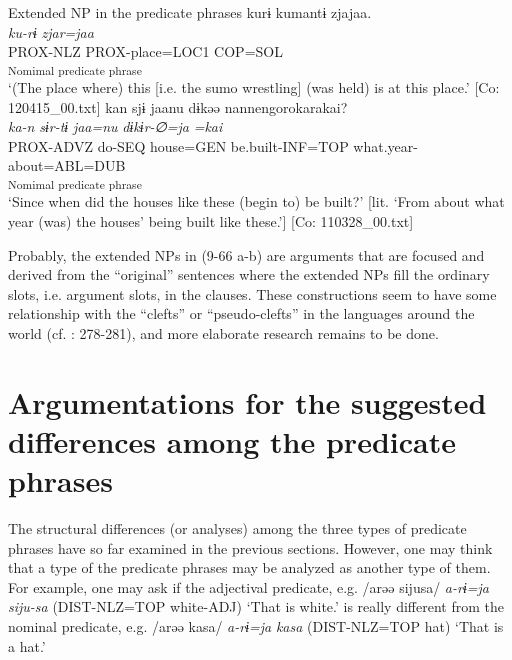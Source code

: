 \ea   Extended NP in the predicate phrases \label{ex:9.66}
\ea %
 \gllll  kurɨ  kumantɨ  zjajaa.\\
      \textit{ku-rɨ}  \textit{}  \textit{zjar=jaa}\\
      PROX-NLZ  PROX-place=LOC1  COP=SOL\\
        [Extended NP  Copula verb]\textsubscript{Nomimal predicate phrase}\\
      \glt       ‘(The place where) this [i.e. the sumo wrestling] (was held) is at this place.’ [Co: 120415\_00.txt]
\ex %
  \glll kan  sjɨ  jaanu  dɨkəə    {\textbar}nannengoro{\textbar}karakai?\\
      \textit{ka-n}  \textit{sɨr-tɨ}  \textit{jaa=nu}  \textit{dɨkɨr-∅=ja} \textit{=kai}\\                                                                           
      PROX-ADVZ  do-SEQ  house=GEN  be.built-INF=TOP                       what.year-about=ABL=DUB\\                                                                           
                                                                           [Extended NP]\textsubscript{Nomimal predicate phrase}\\
      \glt ‘Since when did the houses like these (begin to) be built?’ [lit. ‘From about what year (was) the houses’ being built like these.’]   [Co: 110328\_00.txt]
    \z
\z

Probably, the extended NPs in (9-66 a-b) are arguments that are focused and derived from the “original” sentences where the extended NPs fill the ordinary slots, i.e. argument slots, in the clauses. These constructions seem to have some relationship with the “clefts” or “pseudo-clefts” in the languages around the world (cf. \citealt{Payne1997}: 278-281), and more elaborate research remains to be done.

\section{Argumentations for the suggested differences among the predicate phrases}\label{sec:9.4}

The structural differences (or analyses) among the three types of predicate phrases have so far examined in the previous sections. However, one may think that a type of the predicate phrases may be analyzed as another type of them. For example, one may ask if the adjectival predicate, e.g. /arəə sijusa/ \textit{a-rɨ=ja} \textit{siju-sa} (DIST-NLZ=TOP white-ADJ) ‘That is white.’ is really different from the nominal predicate, e.g. /arəə kasa/ \textit{a-rɨ=ja} \textit{kasa} (DIST-NLZ=TOP hat) ‘That is a hat.’


